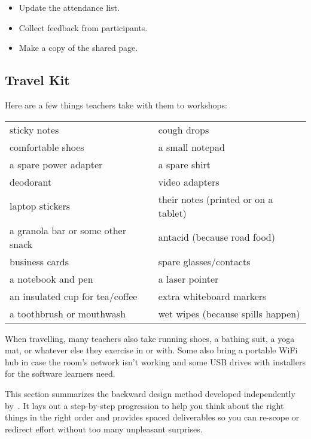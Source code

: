\begin{itemize}

\item
  Update the attendance list.

\item
  Collect feedback from participants.

\item
  Make a copy of the shared page.

\end{itemize}

\subsection*{Travel Kit}

Here are a few things teachers take with them to workshops:

\begin{longtable}{p{}p{}}

sticky notes & cough drops \\
comfortable shoes & a small notepad \\
a spare power adapter & a spare shirt \\
deodorant & video adapters \\
laptop stickers & their notes (printed or on a tablet) \\
a granola bar or some other snack & antacid (because road food) \\
business cards & spare glasses/contacts \\
a notebook and pen & a laser pointer \\
an insulated cup for tea/coffee & extra whiteboard markers \\
a toothbrush or mouthwash & wet wipes (because spills happen) \\

\end{longtable}

When travelling,
many teachers also take running shoes, a bathing suit, a yoga mat,
or whatever else they exercise in or with.
Some also bring a portable WiFi hub in case the room's network isn't working
and some USB drives with installers for the software learners need.


This section summarizes the backward design method
developed independently by~\cite{Wigg2005,Bigg2011,Fink2013}.
It lays out a step-by-step progression
to help you think about the right things in the right order
and provides spaced deliverables
so you can re-scope or redirect effort without too many unpleasant surprises.


